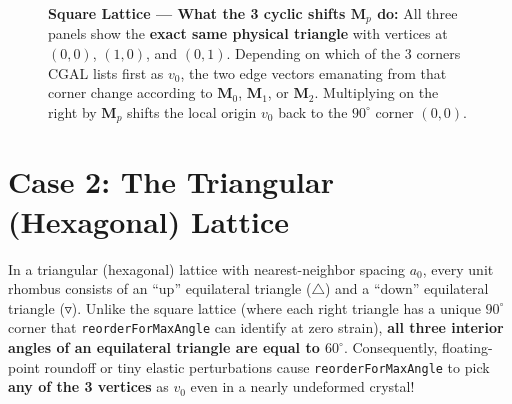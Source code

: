 \documentclass[11pt,a4paper]{article}
\newcommand{\code}[1]{\texttt{#1}}
\begin{document}
\begin{figure}[htbp]
\caption{\textbf{Square Lattice --- What the 3 cyclic shifts $\mathbf{M}_p$ do:} All three panels show the \textbf{exact same physical triangle} with vertices at $(0,0)$, $(1,0)$, and $(0,1)$. Depending on which of the 3 corners CGAL lists first as $v_0$, the two edge vectors emanating from that corner change according to $\mathbf{M}_0$, $\mathbf{M}_1$, or $\mathbf{M}_2$. Multiplying on the right by $\mathbf{M}_p$ shifts the local origin $v_0$ back to the $90^\circ$ corner $(0,0)$.}
\label{fig:tri_orientations}
\end{figure}

\section{Case 2: The Triangular (Hexagonal) Lattice}

In a triangular (hexagonal) lattice with nearest-neighbor spacing $a_0$, every unit rhombus consists of an ``up'' equilateral triangle ($\triangle$) and a ``down'' equilateral triangle ($\triangledown$). Unlike the square lattice (where each right triangle has a unique $90^\circ$ corner that \code{reorderForMaxAngle} can identify at zero strain), \textbf{all three interior angles of an equilateral triangle are equal to $60^\circ$}. Consequently, floating-point roundoff or tiny elastic perturbations cause \code{reorderForMaxAngle} to pick \textbf{any of the 3 vertices} as $v_0$ even in a nearly undeformed crystal!
\end{document}
